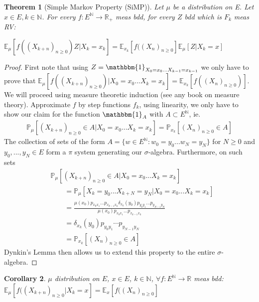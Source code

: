 \documentclass[12pt]{book}
\newtheorem{theorem}{Theorem}[section]
\newtheorem{cor}[theorem]{Corollary}
\theoremstyle{definition}
\theoremstyle{remark}
\begin{document}
\begin{theorem}[Simple Markov Property (SiMP)]
	Let $\mu$ be a distribution on E. Let $x \in E, k \in \mathbb{N}$. For every $f: E^{\mathbb{N}} \to \mathbb{R}_+$ meas bdd, for every $Z$ bdd which is $F_k$ meas RV:

	$\mathbb{E}_\mu \left[ f((X_{k+n})_{n \geq 0})Z | X_k = x_k \right] = \mathbb{E}_{x_k} \left[ f((X_n)_{n \geq 0} \right] \mathbb{E}_\mu \left[ Z | X_k=x \right] $
\end{theorem}
\begin{proof}
	First note that using $Z= \mathbbm{1}_{X_0=x_0...X_{k-1}=x_{k-1}}$ we only have to prove that \newline $\mathbb{E}_{\mu } \left[ f((X_{k+n})_{n\geq 0}) | X_0=x_0 ... X_k=x_k \right]= \mathbb{E}_{x_k} \left[ f((X_n)_{n\geq 0}) \right]$. We will proceed using measure theoretic induction (see any book on measure theory). Approximate $f$ by step functions $f_k$, using linearity, we only have to show our claim for the function $\mathbbm{1}_{A} $ with $A \subset E ^{\mathbb{N}}$, ie. 
	\begin{gather}
	\mathbb{P}_{\mu } \left[ (X_{k+n})_{n\geq 0}\in A | X_0=x_0...X_k=x_k \right] = \mathbb{P}_{x_k} \left[ (X_n)_{n\geq 0} \in A \right] 
\end{gather}  
The collection of sets of the form $A=\{w \in E^{\mathbb{N}}: w_0=y_0...w_N=y_N\}$ for $N\geq 0$ and $y_0,...,y_N \in E$ form a $\pi $ system generating our $\sigma$-algebra. Furthermore, on such sets 
\begin{align}
&	\mathbb{P}_{\mu } \left[ (X_{k+n})_{n\geq 0}\in A | X_0 = x_0...X_k=x_k \right] \\
&\qquad= \mathbb{P}_{\mu} \left[ X_k=y_0...X_{k+N}= y_N | X_0=x_0...X_k=x_k  \right] \\
&\qquad= \frac{\mu (x_0) p_{x_0x_1}...p_{x_{k-1}x_k} \delta_{x_k}(y_0)p_{y_0y_1}...p_{y_{N-1}y_N}}{\mu (x_0) p_{x_0x_1}...p_{x_{k-1}x_k} } \\
& \qquad= \delta_{x_k}(y_0)p_{y_0y_1} \cdots p_{y_{N-1}y_N} \\
& \qquad= \mathbb{P}_{x_k} \left[ (X_n)_{n\geq 0} \in A \right] 
\end{align}
Dynkin's Lemma then allows us to extend this property to the entire $\sigma$-algebra.
\end{proof}


\begin{cor}
	$\mu$ distribution on $E$, $x \in E$, $k \in \mathbb{N}$, $\forall f: E^{\mathbb{N}} \to \mathbb{R}$ meas bdd:
	$\mathbb{E}_\mu \left[ f((X_{k+n})_{n \geq 0} | X_k =x \right] = \mathbb{E} _x \left[ f((X_n)_{n \geq 0} \right]  $
\end{cor}
\end{document}
